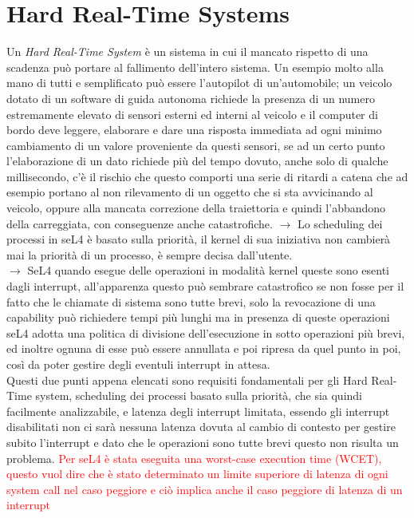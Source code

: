 \section{Hard Real-Time Systems}
Un \textit{Hard Real-Time System} è un sistema in cui il mancato rispetto di una scadenza può portare al fallimento dell'intero sistema. Un esempio molto alla mano di tutti e semplificato può essere l'autopilot di un'automobile; un veicolo dotato di un software di guida autonoma richiede la presenza di un numero estremamente elevato di sensori esterni ed interni al veicolo e il computer di bordo deve leggere, elaborare e dare una risposta immediata ad ogni minimo cambiamento di un valore proveniente da questi sensori, se ad un certo punto l'elaborazione di un dato richiede più del tempo dovuto, anche solo di qualche millisecondo, c'è il rischio che questo comporti una serie  di ritardi a catena che ad esempio portano al non rilevamento di un oggetto che si sta avvicinando al veicolo, oppure alla mancata correzione della traiettoria e quindi l'abbandono della carreggiata, con conseguenze anche catastrofiche.
$\rightarrow$ Lo scheduling dei processi in seL4 è basato sulla priorità, il kernel di sua iniziativa non cambierà mai la priorità di un processo, è sempre decisa dall'utente.\\
$\rightarrow$ SeL4 quando esegue delle operazioni in modalità kernel queste sono esenti dagli interrupt, all'apparenza questo può sembrare catastrofico se non fosse per il fatto che le chiamate di sistema sono tutte brevi, solo la revocazione di una capability può richiedere tempi più lunghi ma in presenza di queste operazioni seL4 adotta una politica di divisione dell'esecuzione in sotto operazioni più brevi, ed inoltre ognuna di esse può essere annullata e poi ripresa da quel punto in poi, così da poter gestire degli eventuli interrupt in attesa.\\
Questi due punti appena elencati sono requisiti fondamentali per gli Hard Real-Time system, scheduling dei processi basato sulla priorità, che sia quindi facilmente analizzabile, e latenza degli interrupt limitata, essendo gli interrupt disabilitati non ci sarà nessuna latenza dovuta al cambio di contesto per gestire subito l'interrupt e dato che le operazioni sono tutte brevi questo non risulta un problema.
\textcolor{red}{Per seL4 è stata eseguita una worst-case execution time (WCET), questo vuol dire che è stato determinato un limite superiore di latenza di ogni system call nel caso peggiore e ciò implica anche il caso peggiore di latenza di un interrupt}
